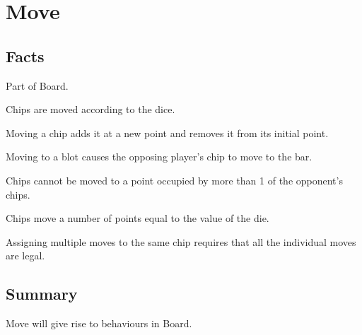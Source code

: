 \section{Move}

\subsection{Facts}

\begin{dashed}
    \item Part of Board.
    \item Chips are moved according to the dice.
    \item Moving a chip adds it at a new point and removes it from its initial point.
    \item Moving to a blot causes the opposing player’s chip to move to the bar.
    \item Chips cannot be moved to a point occupied by more than 1 of the opponent's chips.
    \item Chips move a number of points equal to the value of the die.
    \item Assigning multiple moves to the same chip requires that all the individual moves are legal.
\end{dashed}


\subsection{Summary}
Move will give rise to behaviours in Board.

